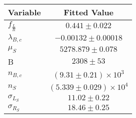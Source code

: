 \begin{tabular}[t]{lc}
\hline
Variable &Fitted Value\\
\hline\hline
$f_{\frac{L}{R}}$&$0.441\pm0.022$\\
\hline
$\lambda_{B,c}$&$-0.00132\pm0.00018$\\
\hline
$\mu_S$&$5278.879\pm0.078$\\
\hline
B&$2308\pm53$\\
\hline
$n_{B,c}$&$(9.31\pm0.21)\times 10^3$\\
\hline
$n_S$&$(5.339\pm0.029)\times 10^4$\\
\hline
$\sigma_{L_S}$&$11.02\pm0.22$\\
\hline
$\sigma_{R_S}$&$18.46\pm0.25$\\
\hline
\end{tabular}